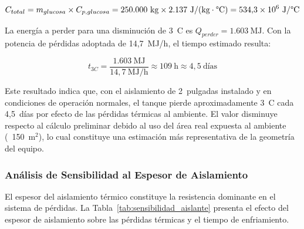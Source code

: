 \begin{equation}
C_{total} = m_{glucosa} \times C_{p,glucosa} = 250{.}000~\text{kg} \times 2{.}137~\text{J/(kg}\cdot\text{\textdegree C)} = 534{,}3 \times 10^{6}~\text{J/\textdegree C}
\label{eq:capacidad_termica}
\end{equation}

La energ\'ia a perder para una disminuci\'on de 3~\textdegree C es $Q_{perder} = 1{.}603~\text{MJ}$. Con la potencia de p\'erdidas adoptada de 14,7~MJ/h, el tiempo estimado resulta:

\begin{equation}
\boxed{t_{3C} = \frac{1{.}603~\text{MJ}}{14,7~\text{MJ/h}} \approx 109~\text{h} \approx 4{,}5~\text{d\'ias}}
\end{equation}

Este resultado indica que, con el aislamiento de 2~pulgadas instalado y en condiciones de operaci\'on normales, el tanque pierde aproximadamente 3~\textdegree C cada 4,5~d\'ias por efecto de las p\'erdidas t\'ermicas al ambiente. El valor disminuye respecto al c\'alculo preliminar debido al uso del \'area real expuesta al ambiente (~150~m$^2$), lo cual constituye una estimaci\'on m\'as representativa de la geometr\'ia del equipo.

\subsubsection{An\'alisis de Sensibilidad al Espesor de Aislamiento}

El espesor del aislamiento t\'ermico constituye la resistencia dominante en el sistema de p\'erdidas. La Tabla~\ref{tab:sensibilidad_aislante} presenta el efecto del espesor de aislamiento sobre las p\'erdidas t\'ermicas y el tiempo de enfriamiento.

